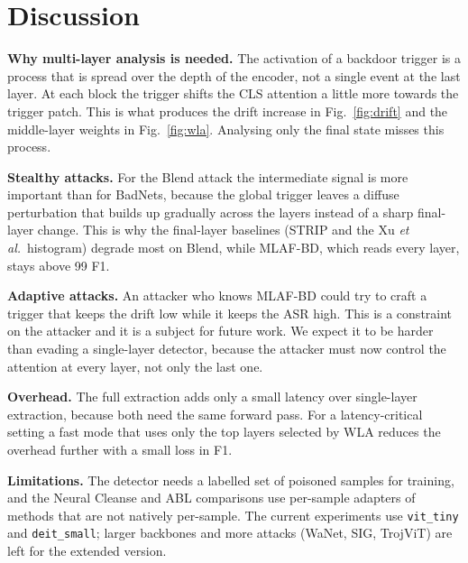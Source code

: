 \documentclass[journal]{IEEEtran}
\begin{document}


\section{Discussion}
\textbf{Why multi-layer analysis is needed.} The activation of a backdoor
trigger is a process that is spread over the depth of the encoder, not a single
event at the last layer. At each block the trigger shifts the CLS attention a
little more towards the trigger patch. This is what produces the drift increase
in Fig.~\ref{fig:drift} and the middle-layer weights in Fig.~\ref{fig:wla}.
Analysing only the final state misses this process.

\textbf{Stealthy attacks.} For the Blend attack the intermediate signal is more
important than for BadNets, because the global trigger leaves a diffuse
perturbation that builds up gradually across the layers instead of a sharp
final-layer change. This is why the final-layer baselines (STRIP and the Xu
\emph{et al.}\ histogram) degrade most on Blend, while MLAF-BD, which reads every
layer, stays above 99 F1.

\textbf{Adaptive attacks.} An attacker who knows MLAF-BD could try to craft a
trigger that keeps the drift low while it keeps the ASR high. This is a
constraint on the attacker and it is a subject for future work. We expect it to
be harder than evading a single-layer detector, because the attacker must now
control the attention at every layer, not only the last one.

\textbf{Overhead.} The full extraction adds only a small latency over
single-layer extraction, because both need the same forward pass. For a
latency-critical setting a fast mode that uses only the top layers selected by
WLA reduces the overhead further with a small loss in F1.

\textbf{Limitations.} The detector needs a labelled set of poisoned samples for
training, and the Neural Cleanse and ABL comparisons use per-sample adapters of
methods that are not natively per-sample. The current experiments use
\texttt{vit\_tiny} and \texttt{deit\_small}; larger backbones and more attacks
(WaNet, SIG, TrojViT) are left for the extended version.
\end{document}

